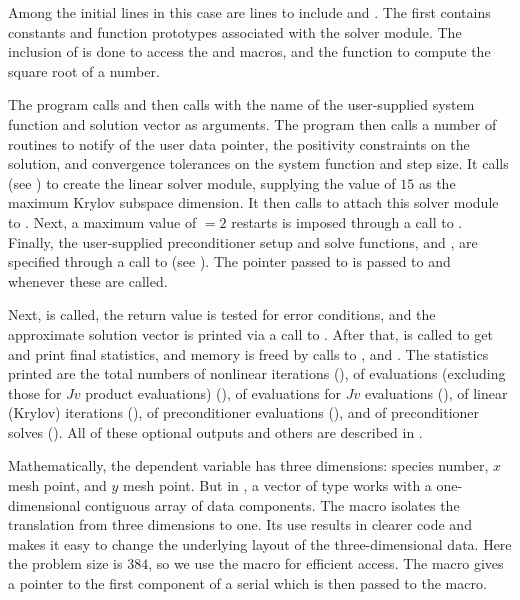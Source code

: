 Among the initial  lines in this case are lines to
include  and .  The first contains
constants and function prototypes associated with the {\spgmr} solver module.
The inclusion of  is done to access the  and
 macros, and the  function to compute the square root
of a  number.

The  program calls  and then calls  with the
name of the user-supplied system function  and solution vector as
arguments.  The  program then calls a number of 
routines to notify {\kinsol} of the user data pointer, the
positivity constraints on the solution, and convergence tolerances on
the system function and step size.
It calls  (see ) to
create the {\spgmr} linear solver module, supplying the 
value of $15$ as the maximum Krylov subspace dimension.  It then calls
 to attach this solver module to {\kinsol}.
Next, a maximum value of  $=2$ restarts is imposed through
a call to .  Finally, the
user-supplied preconditioner setup and solve functions,
 and , are specified through a call to
 (see ).
The  pointer passed to  is passed to  
and  whenever these are called. 

Next,  is called, the return value is tested for error conditions, and
the approximate solution vector is printed via a call to .
After that,  is called to get and print final statistics, and
memory is freed by calls to ,  and .
The statistics printed are the total numbers of nonlinear iterations (),
of  evaluations (excluding those for $Jv$ product evaluations) (),
of  evaluations for $Jv$ evaluations (), of linear (Krylov)
iterations (), of preconditioner evaluations (), and of
preconditioner solves (). All of these optional outputs and others are
described in .

Mathematically, the dependent variable has three dimensions: species
number, $x$ mesh point, and $y$ mesh point.  But in {\nvecs}, a vector of
type  works with a one-dimensional contiguous array of
data components. The macro  isolates the translation from
three dimensions to one. Its use results in clearer code and makes it
easy to change the underlying layout of the three-dimensional data. 
Here the problem size is $384$, so we use the  macro
for efficient  access. The  macro gives
a pointer to the first component of a serial  which is then
passed to the  macro.

